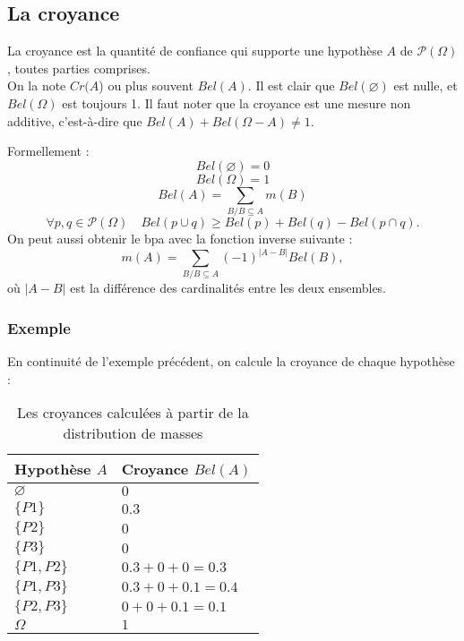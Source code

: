 \subsection{La croyance}

La croyance est la quantité de confiance qui supporte une hypothèse $A$ de
$\mathcal{P}(\Omega)$, toutes parties comprises.\\
On la note $Cr(A$) ou plus souvent $Bel(A)$. Il est clair que $Bel(\varnothing)$
est nulle, et $Bel(\Omega)$ est toujours 1. Il faut noter que la croyance est une
mesure non additive, c’est-à-dire que $Bel(A) + Bel(\Omega - A) \neq 1$.

Formellement :
\begin{equation}
Bel(\varnothing)=0
\end{equation}
\begin{equation}
Bel(\Omega)=1
\end{equation}
\begin{equation}
Bel(A) = \sum_{B \slash B \subseteq A} m(B)
\end{equation}
\begin{equation}
\forall p,q \in \mathcal{P}(\Omega) \quad Bel(p \cup q) \geq Bel(p) + Bel(q) - Bel(p \cap q).
\end{equation}
On peut aussi obtenir le bpa avec la fonction inverse suivante :
\begin{equation}
m(A) = \sum_{B \slash B \subseteq A} (-1)^{|A-B|} Bel(B),
\end{equation}
où $|A-B|$ est la différence des cardinalités entre les deux ensembles.

\subsubsection{Exemple}
En continuité de l'exemple précédent, on calcule la croyance de chaque hypothèse :

\begin{table}[H]
\centering
\begin{tabular}{|l|l|}
\hline
Hypothèse $A$ & Croyance $Bel(A)$\\
\hline
$\varnothing$ & $0$ \\
\hline
$\{P1\}$ & $0.3$ \\
\hline
$\{P2\}$ & $0$ \\
\hline
$\{P3\}$ & $0$ \\
\hline
$\{P1, P2\}$ & $0.3 + 0 + 0 = 0.3$ \\
\hline
$\{P1, P3\}$ & $0.3 + 0 + 0.1 = 0.4$ \\
\hline
$\{P2, P3\}$ & $0 + 0 + 0.1 = 0.1$ \\
\hline
$\Omega$ & $1$ \\
\hline
\end{tabular}
\caption{Les croyances calculées à partir de la distribution de masses}
\end{table}


